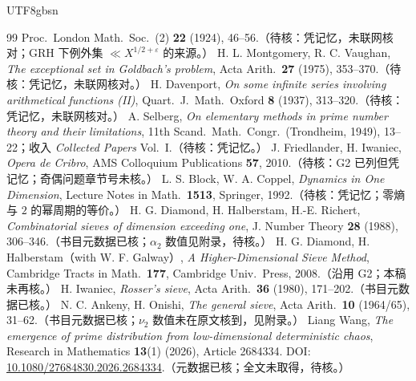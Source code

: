 \documentclass[11pt,a4paper]{article}
\theoremstyle{plain}
\theoremstyle{definition}
\begin{document}
\begin{CJK}{UTF8}{gbsn}
\begin{thebibliography}{99}
Proc.\ London Math.\ Soc.\ (2) \textbf{22} (1924), 46--56.（待核：凭记忆，未联网核对；GRH 下例外集 $\ll X^{1/2+\varepsilon}$ 的来源。）
 H. L. Montgomery, R. C. Vaughan, \emph{The exceptional set in Goldbach's problem}, Acta Arith.\ \textbf{27} (1975), 353--370.（待核：凭记忆，未联网核对。）
 H. Davenport, \emph{On some infinite series involving arithmetical functions (II)}, Quart.\ J.\ Math.\ Oxford \textbf{8} (1937), 313--320.（待核：凭记忆，未联网核对。）
 A. Selberg, \emph{On elementary methods in prime number theory and their limitations}, 11th Scand.\ Math.\ Congr.\ (Trondheim, 1949), 13--22；收入 \emph{Collected Papers} Vol.\ I.（待核：凭记忆。）
 J. Friedlander, H. Iwaniec, \emph{Opera de Cribro}, AMS Colloquium Publications \textbf{57}, 2010.（待核：G2 已列但凭记忆；奇偶问题章节号未核。）
 L. S. Block, W. A. Coppel, \emph{Dynamics in One Dimension}, Lecture Notes in Math.\ \textbf{1513}, Springer, 1992.（待核：凭记忆；零熵与 $2$ 的幂周期的等价。）
 H. G. Diamond, H. Halberstam, H.-E. Richert, \emph{Combinatorial sieves of dimension exceeding one}, J. Number Theory \textbf{28} (1988), 306--346.（书目元数据已核；$\alpha_2$ 数值见附录，待核。）
 H. G. Diamond, H. Halberstam（with W. F. Galway）, \emph{A Higher-Dimensional Sieve Method}, Cambridge Tracts in Math.\ \textbf{177}, Cambridge Univ.\ Press, 2008.（沿用 G2；本稿未再核。）
 H. Iwaniec, \emph{Rosser's sieve}, Acta Arith.\ \textbf{36} (1980), 171--202.（书目元数据已核。）
 N. C. Ankeny, H. Onishi, \emph{The general sieve}, Acta Arith.\ \textbf{10} (1964/65), 31--62.（书目元数据已核；$\nu_2$ 数值未在原文核到，见附录。）
 Liang Wang, \emph{The emergence of prime distribution from low-dimensional deterministic chaos},
Research in Mathematics \textbf{13}(1) (2026), Article 2684334. DOI: \url{10.1080/27684830.2026.2684334}.（元数据已核；全文未取得，待核。）
\end{thebibliography}

\end{CJK}
\end{document}
